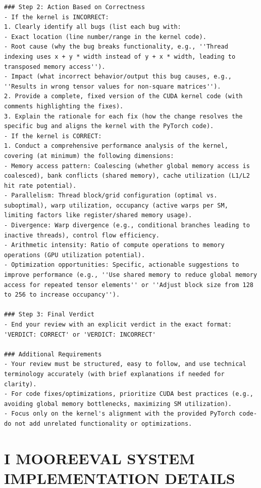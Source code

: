 \documentclass[
  10
]{article}
\begin{document}
\begin{verbatim}
### Step 2: Action Based on Correctness
- If the kernel is INCORRECT:
1. Clearly identify all bugs (list each bug with:
- Exact location (line number/range in the kernel code).
- Root cause (why the bug breaks functionality, e.g., ''Thread indexing uses x + y * width instead of y + x * width, leading to transposed memory access'').
- Impact (what incorrect behavior/output this bug causes, e.g., ''Results in wrong tensor values for non-square matrices'').
2. Provide a complete, fixed version of the CUDA kernel code (with comments highlighting the fixes).
3. Explain the rationale for each fix (how the change resolves the specific bug and aligns the kernel with the PyTorch code).
- If the kernel is CORRECT:
1. Conduct a comprehensive performance analysis of the kernel, covering (at minimum) the following dimensions:
- Memory access pattern: Coalescing (whether global memory access is coalesced), bank conflicts (shared memory), cache utilization (L1/L2 hit rate potential).
- Parallelism: Thread block/grid configuration (optimal vs. suboptimal), warp utilization, occupancy (active warps per SM, limiting factors like register/shared memory usage).
- Divergence: Warp divergence (e.g., conditional branches leading to inactive threads), control flow efficiency.
- Arithmetic intensity: Ratio of compute operations to memory operations (GPU utilization potential).
- Optimization opportunities: Specific, actionable suggestions to improve performance (e.g., ''Use shared memory to reduce global memory access for repeated tensor elements'' or ''Adjust block size from 128 to 256 to increase occupancy'').

### Step 3: Final Verdict
- End your review with an explicit verdict in the exact format:
'VERDICT: CORRECT' or 'VERDICT: INCORRECT'

### Additional Requirements
- Your review must be structured, easy to follow, and use technical terminology accurately (with brief explanations if needed for clarity).
- For code fixes/optimizations, prioritize CUDA best practices (e.g., avoiding global memory bottlenecks, maximizing SM utilization).
- Focus only on the kernel's alignment with the provided PyTorch code-do not add unrelated functionality or optimizations. 
\end{verbatim}

\section{I MOOREEVAL SYSTEM IMPLEMENTATION
DETAILS}\label{i-mooreeval-system-implementation-details}
\end{document}
